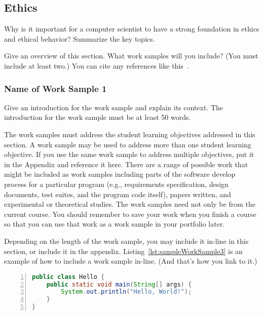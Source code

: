 \subsection{Ethics}
Why is it important for a computer scientist to have a strong foundation in
ethics and ethical behavior?  Summarize the key topics.

Give an overview of this section.  What work samples will you include?
(You must include at least two.)  You can cite any references like
this~\cite{parks:samsfsoal:2009}.

\subsubsection{Name of Work Sample 1}
Give an introduction for the work sample and explain its context.  The
introduction for the work sample must be at least 50 words.

The work samples must address the student learning objectives addressed in
this section.  A work sample may be used to address more than one student
learning objective.  If you use the same work sample to address multiple
objectives, put it in the Appendix and reference it here.
There are a range of possible work that might be
included as work samples including parts of the software develop process
for a particular program (e.g., requirements specification, design documents,
test suites, and the program code itself), papers written, and
experimental or theoretical studies.  The work samples need not only
be from the current course.  You should remember to save your work when
you finish a course so that you can use that work as a work sample in
your portfolio later.

Depending on the length of the work sample, you may include it in-line in
this section, or include it in the appendix.  Listing~\ref{lst:sampleWorkSample3}
is an example of how to include a work sample in-line. (And that's how you
link to it.)

\begin{singlespace}
\begin{lstlisting}[float,
                   escapeinside='',
                   basicstyle=\ttfamily\footnotesize,
                   emphstyle=\textbf,
                   numberstyle=\tiny,
                   xleftmargin=.3cm,
                   language=java,
                   numbers=left,
                   numbersep=5pt,
                   firstnumber=auto,
                   stepnumber=1,
                   numberblanklines=true,
                   showspaces=false,
                   showstringspaces=false,
                   showtabs=false,
                   captionpos=b,
                   caption=Sample Java Source File,
                   label=lst:sampleWorkSample3]
public class Hello {
    public static void main(String[] args) {
        System.out.println("Hello, World!");
    }
}
\end{lstlisting}
\end{singlespace}


